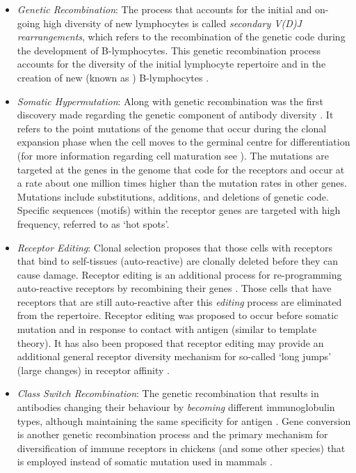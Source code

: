 \begin{itemize}
	\item \emph{Genetic Recombination}: The process that accounts for the initial and on-going high diversity of new lymphocytes is called \emph{secondary V(D)J rearrangements}, which refers to the recombination of the genetic code during the development of B-lymphocytes. This genetic recombination process accounts for the diversity of the initial lymphocyte repertoire and in the creation of new (known as \naive) B-lymphocytes \cite{Tonegawa1983, Tonegawa1988}.
	
	\item \emph{Somatic Hypermutation}: Along with genetic recombination was the first discovery made regarding the genetic component of antibody diversity \cite{Tonegawa1983}. It refers to the point mutations of the genome that occur during the clonal expansion phase when the cell moves to the germinal centre for differentiation (for more information regarding cell maturation see \cite{Berek1991, Berek1993}). The mutations are targeted at the genes in the genome that code for the receptors and occur at a rate about one million times higher than the mutation rates in other genes. Mutations include substitutions, additions, and deletions of genetic code. Specific sequences (motifs) within the receptor genes are targeted with high frequency, referred to as `hot spots'.
	
	\item \emph{Receptor Editing}: Clonal selection proposes that those cells with receptors that bind to self-tissues (auto-reactive) are clonally deleted before they can cause damage. Receptor editing is an additional process for re-programming auto-reactive receptors by recombining their genes \cite{Rajewsky1998, Nussenzweig1998}. Those cells that have receptors that are still auto-reactive after this \emph{editing} process are eliminated from the repertoire. Receptor editing was proposed to occur before somatic mutation and in response to contact with antigen (similar to template theory). It has also been proposed that receptor editing may provide an additional general receptor diversity mechanism for so-called `long jumps' (large changes) in receptor affinity \cite{George1999}.
	
	\item \emph{Class Switch Recombination}: The genetic recombination that results in antibodies changing their behaviour by \emph{becoming} different immunoglobulin types, although maintaining the same specificity for antigen \cite{Harriman1993, Li2004}. Gene conversion is another genetic recombination process and the primary mechanism for diversification of immune receptors in chickens (and some other species) that is employed instead of somatic mutation used in mammals \cite{Wysocki1989, Li2004}.
\end{itemize}

